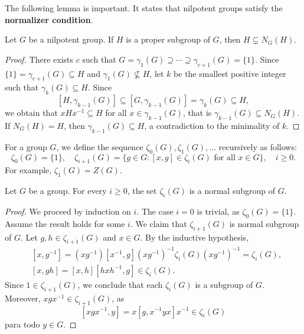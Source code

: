 The following lemma is important. It states that nilpotent groups satisfy 
the \textbf{normalizer condition}. 

\begin{lemma}
\label{lem:normalizadora}
Let $G$ be a nilpotent group. If $H$ is a proper subgroup of $G$, then 
$H\subsetneq N_G(H)$.
\end{lemma}

\begin{proof}
There exists $c$ such that $G=\gamma_1(G)\supseteq\cdots\supseteq\gamma_{c+1}(G)=\{1\}$. Since 
$\{1\}=\gamma_{c+1}(G)\subseteq H$ and $\gamma_1(G)\not\subseteq H$, 
let $k$ be the smallest positive integer such that  $\gamma_k(G)\subseteq H$. 
Since
\[
[H,\gamma_{k-1}(G)]\subseteq [G,\gamma_{k-1}(G)]=\gamma_k(G)\subseteq H,
\]
we obtain that  
$xHx^{-1}\subseteq H$ for all $x\in\gamma_{k-1}(G)$,
that is $\gamma_{k-1}(G)\subseteq N_G(H)$. If $N_G(H)=H$, then
$\gamma_{k-1}(G)\subseteq H$, a contradiction to the minimality of $k$. 
\end{proof}



For a group $G$, we define the sequence  $\zeta_0(G),\zeta_1(G),\dots$
recursively as follows: 
\[
	\zeta_0(G)=\{1\},\quad
	\zeta_{i+1}(G)=\{g\in G:[x,g]\in\zeta_{i}(G)\text{ for all $x\in G$}\},\quad i\geq 0.
\]
For example, $\zeta_1(G)=Z(G)$.

\begin{lemma}
\label{lem:central_ascendente}
Let $G$ be a group. For every $i\geq0$, the set $\zeta_i(G)$ 
is a normal subgroup of $G$. 
\end{lemma}

\begin{proof}
We proceed by induction on $i$. The case $i=0$ is trivial, as 
$\zeta_0(G)=\{1\}$. Assume the result holds for some $i$.
We claim that $\zeta_{i+1}(G)$ is normal subgroup of $G$. 
Let $g,h\in \zeta_{i+1}(G)$ and $x\in G$. By the inductive hypothesis, 
\begin{align*}
	&[x,g^{-1}]=(xg^{-1})[x^{-1},g](xg^{-1})^{-1}\zeta_i(G)(xg^{-1})^{-1}=\zeta_i(G),\\
	&[x,gh]=[x,h][hxh^{-1},g]\in \zeta_{i}(G).
\end{align*}
Since $1\in\zeta_{i+1}(G)$, we conclude that each $\zeta_i(G)$ is a subgroup of $G$. 
Moreover, $xgx^{-1}\in\zeta_{i+1}(G)$, as  
	\[
	[xgx^{-1},y]=x[g,x^{-1}yx]x^{-1}\in\zeta_{i}(G)
	\]
para todo $y\in G$.
\end{proof}


